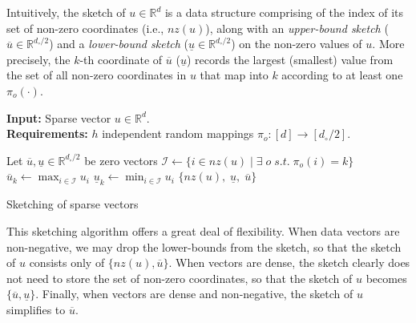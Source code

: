 Intuitively, the sketch of $u \in \mathbb{R}^d$ is a data structure comprising of
the index of its set of non-zero coordinates (i.e., $\mathit{nz}(u)$), along with
an \emph{upper-bound sketch} ($\overline{u} \in \mathbb{R}^{d_\circ/2}$) and
a \emph{lower-bound sketch} ($\underline{u} \in \mathbb{R}^{d_\circ/2}$) on the non-zero values of $u$.
More precisely, the $k$-th coordinate of $\overline{u}$ ($\underline{u}$)
records the largest (smallest) value from the set of all non-zero coordinates in $u$
that map into $k$ according to at least one $\pi_o(\cdot)$.

\begin{algorithm}[!t]
\SetAlgoLined
{\bf Input: }{Sparse vector $u \in \mathbb{R}^d$.}\\
{\bf Requirements: }{$h$ independent random mappings $\pi_o: [d] \rightarrow [d_\circ/2]$.}\\

\begin{algorithmic}[1]
    \STATE Let $\overline{u}, \underline{u} \in \mathbb{R}^{d_\circ/2} $ be zero vectors
        \STATE $\mathcal{I} \leftarrow \{ i \in \mathit{nz}(u) \;|\; \exists \;o\; \mathit{s.t.}\; \pi_o(i) = k \}$
        \STATE $\overline{u}_k \leftarrow \max_{i \in \mathcal{I}} u_i$ \label{algorithm:indexing:upper-bound-sketch}
        \STATE $\underline{u}_k \leftarrow \min_{i \in \mathcal{I}} u_i$
    \ENDFOR
    \RETURN $\{ \mathit{nz}(u),\; \underline{u},\; \overline{u} \}$
 \end{algorithmic}
 \caption{Sketching of sparse vectors}
\label{algorithm:sketching:sinnamon:sketching}
\end{algorithm}

\begin{svgraybox}
This sketching algorithm offers a great deal of flexibility.
When data vectors are non-negative, we may drop the lower-bounds
from the sketch, so that the sketch of $u$ consists only
of $\{ \mathit{nz}(u), \overline{u} \}$.
When vectors are dense, the sketch clearly does not need to store
the set of non-zero coordinates, so that the sketch of $u$ becomes
$\{ \overline{u}, \underline{u} \}$. Finally, when vectors are dense
and non-negative, the sketch of $u$ simplifies to $\overline{u}$.
\end{svgraybox}

